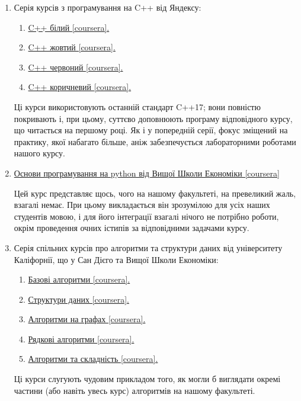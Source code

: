 \documentclass[14pt, a4paper]{extarticle}  %
\begin{document}
\begin{enumerate}
    \item Серія курсів з програмування на C++ від Яндексу:
    \begin{enumerate}
    	\item \href{https://www.coursera.org/learn/c-plus-plus-white/home/welcome}{C++ білий [coursera].}
    	\item \href{https://www.coursera.org/learn/c-plus-plus-yellow/home/welcome}{C++ жовтий [coursera].}
    	\item \href{https://www.coursera.org/learn/c-plus-plus-red/home/welcome}{C++ червоний [coursera].}
    	\item \href{https://www.coursera.org/learn/c-plus-plus-brown/home/welcome}{C++ коричневий [coursera].}
    \end{enumerate}
    Ці курси використовують останній стандарт C++17; вони повністю покривають і, при цьому, суттєво доповнюють програму відповідного курсу, що читається на першому році. Як і у попередній серії, фокус зміщений на практику, якої набагато більше, аніж забезпечується лабораторними роботами нашого курсу.

    \item \href{https://www.coursera.org/learn/python-osnovy-programmirovaniya/home/welcome}{Основи програмування на python від Вищої Школи Економіки [coursera]} 
    
    Цей курс представляє щось, чого на нашому факультеті, на превеликий жаль, взагалі немає. При цьому викладається він зрозумілою для усіх наших студентів мовою, і для його інтеграції взагалі нічого не потрібно роботи, окрім проведення очних істипів за відповідними задачами курсу.

    \item Серія спільних курсів про алгоритми та структури даних від університету Каліфорнії, що у Сан Дієго та Вищої Школи Економіки:
    \begin{enumerate}
    	\item \href{https://www.coursera.org/learn/algorithmic-toolbox}{Базові алгоритми [coursera].}
    	\item \href{https://www.coursera.org/learn/data-structures}{Структури даних [coursera].}
    	\item \href{https://www.coursera.org/learn/algorithms-on-graphs}{Алгоритми на графах [coursera].}
    	\item \href{https://www.coursera.org/learn/algorithms-on-strings}{Рядкові алгоритми [coursera].}
    	\item \href{https://www.coursera.org/learn/advanced-algorithms-and-complexity}{Алгоритми та складність [coursera].}
    \end{enumerate}
    Ці курси слугують чудовим прикладом того, як могли б виглядати окремі частини (або навіть увесь курс) алгоритмів на нашому факультеті. 
  

\end{enumerate}
\end{document}
